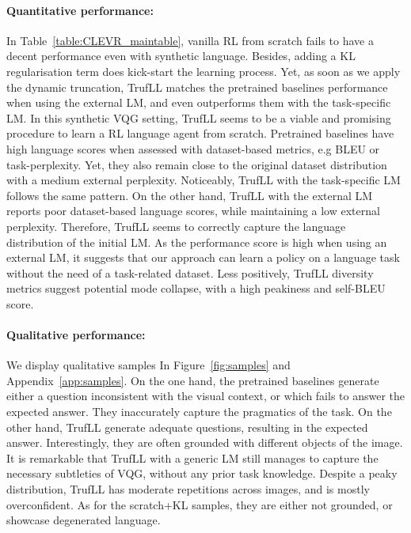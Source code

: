 \documentclass{article}
\newcommand{\algo}{TrufLL\xspace}
\begin{document}
\paragraph{Quantitative performance:} 
In Table~\ref{table:CLEVR_maintable}, vanilla RL from scratch fails to have a decent performance even with synthetic language. Besides, adding a KL regularisation term does kick-start the learning process. Yet, as soon as we apply the dynamic truncation, \algo matches the pretrained baselines performance when using the external LM, and even outperforms them with the task-specific LM. In this synthetic VQG setting, \algo seems to be a viable and promising procedure to learn a RL language agent from scratch. Pretrained baselines have high language scores when assessed with dataset-based metrics, e.g BLEU or task-perplexity. Yet, they also remain close to the original dataset distribution with a medium external perplexity. Noticeably, \algo with the task-specific LM follows the same pattern. On the other hand, \algo with the external LM reports poor dataset-based language scores, while maintaining a low external perplexity. Therefore, \algo seems to correctly capture the language distribution of the initial LM. As the performance score is high when using an external LM, it suggests that our approach can learn a policy on a language task without the need of a task-related dataset. 
Less positively, \algo diversity metrics suggest potential mode collapse, with a high peakiness and self-BLEU score.

\paragraph{Qualitative performance:}
We display qualitative samples In Figure~\ref{fig:samples} and Appendix~\ref{app:samples}. 
On the one hand, the pretrained baselines generate either a question inconsistent with the visual context, or which fails to answer the expected answer. They inaccurately capture the pragmatics of the task. On the other hand, \algo generate adequate questions, resulting in the expected answer. Interestingly, they are often grounded with different objects of the image. It is remarkable that \algo with a generic LM still manages to capture the necessary subtleties of VQG, without any prior task knowledge. Despite a peaky distribution, \algo has moderate repetitions across images, and is mostly overconfident. As for the scratch+KL samples, they are either not grounded, or showcase degenerated language. 
\end{document}
